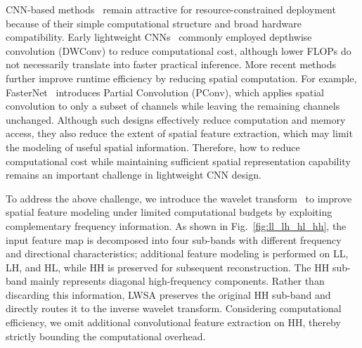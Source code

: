 \documentclass[a4paper,fleqn]{cas-dc}
\begin{document}
CNN-based methods~\cite{sandler2018mobilenetv2,wadekar2022mobilevitv3,tan2021efficientnetv2} 
{\color{blue}remain attractive for resource-constrained deployment because of their simple computational structure and broad hardware compatibility.} 
Early {\color{blue}lightweight CNNs}~\cite{howard2017mobilenets,tan2019rethinking,ma2018shufflenet,zhang2018shufflenet} 
{\color{blue}commonly employed depthwise convolution (DWConv) to reduce computational cost, although lower FLOPs do not necessarily translate into faster practical inference. More recent methods further improve runtime efficiency by reducing spatial computation. For example, FasterNet}~\cite{chen2023run} 
{\color{blue}introduces Partial Convolution (PConv), which applies spatial convolution to only a subset of channels while leaving the remaining channels unchanged.}
{\color{blue}Although such designs effectively reduce computation and memory access, they also reduce the extent of spatial feature extraction, which may limit the modeling of useful spatial information. Therefore, how to reduce computational cost while maintaining sufficient spatial representation capability remains an important challenge in lightweight CNN design.}



{\color{blue}
To address the above challenge, we introduce the wavelet transform~\cite{daubechies1992ten} to improve spatial feature modeling under limited computational budgets by exploiting complementary frequency information.
}
{\color{blue}
As shown in Fig.~\ref{fig:ll_lh_hl_hh}, the input feature map is decomposed into four sub-bands with different frequency and directional characteristics; additional feature modeling is performed on LL, LH, and HL, while HH is preserved for subsequent reconstruction.
}
{ \color{green}
The HH sub-band mainly represents diagonal high-frequency components.
Rather than discarding this information, LWSA preserves the original
HH sub-band and directly routes it to the inverse wavelet transform.
Considering computational efficiency, we omit additional convolutional
feature extraction on HH, thereby strictly bounding the computational
overhead.
}

\end{document}
